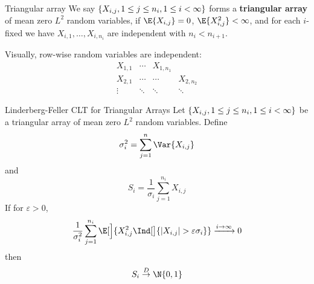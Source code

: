\begin{Definition}{Triangular array}{}
    We say $ \{X_{i,j},1\le j\le n_i,1\le i<\infty\} $ forms a
    \textbf{triangular array} of mean zero $ L^2 $ random
    variables, if $ \E{X_{i,j}}=0 $, $ \E{X_{i,j}^2}<\infty $, and
    for each $ i $-fixed we have $ X_{i,1},\ldots,X_{i,n_i} $
    are independent with $ n_i<n_{i+1} $.
\end{Definition}
Visually, row-wise random variables are independent:
\[ \begin{matrix}
        X_{1,1} & \cdots & X_{1,n_1}             \\
        X_{2,1} & \cdots & \cdots    & X_{2,n_2} \\
        \vdots  & \ddots & \ddots    & \ddots
    \end{matrix} \]
\begin{Theorem}{Linderberg-Feller CLT for Triangular Arrays}{}
    Let $ \{X_{i,j},1\le j\le n_i,1\le i<\infty\} $
    be a triangular array of mean zero $ L^2 $ random variables.
    Define
    \[ \sigma_i^2=\sum_{j=1}^{n} \Var{X_{i,j}} \]
    and
    \[ S_i=\frac{1}{\sigma_i} \sum_{j=1}^{n_i} X_{i,j} \]
    If for $ \varepsilon>0 $,
    \[ \frac{1}{\sigma_i^2}\sum_{j=1}^{n_i} \E[\Big]{X_{i,j}^2
            \Ind[\big]{\abs{X_{i,j}}>\varepsilon\sigma_i}}\xrightarrow{i\to\infty}0 \]
    then
    \[ S_i\stackrel{D}{\to}\N{0,1} \]
\end{Theorem}
